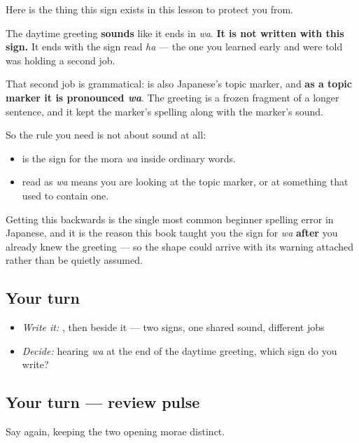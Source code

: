 \begin{grammarlens}[title={What you've built — and the trap}]
Here is the thing this sign exists in this lesson to protect you from.

The daytime greeting \textbf{sounds} like it ends in \emph{wa}. \textbf{It is not written with this sign.} It ends with the sign read \emph{ha} — the one you learned early and were told was holding a second job.

That second job is grammatical:  is also Japanese's topic marker, and \textbf{as a topic marker it is pronounced \emph{wa}}. The greeting is a frozen fragment of a longer sentence, and it kept the marker's spelling along with the marker's sound.

So the rule you need is not about sound at all:

\begin{itemize}
\raggedright
  \item \textbf{} is the sign for the mora \emph{wa} inside ordinary words.
  \item \textbf{} read as \emph{wa} means you are looking at the topic marker, or at something that used to contain one.
\end{itemize}

Getting this backwards is the single most common beginner spelling error in Japanese, and it is the reason this book taught you the sign for \emph{wa} \textbf{after} you already knew the greeting — so the shape could arrive with its warning attached rather than be quietly assumed.
\end{grammarlens}

\subsection*{Your turn}
\begin{itemize}
\raggedright
  \item \emph{Write it:} , then  beside it — two signs, one shared sound, different jobs
  \item \emph{Decide:} hearing \emph{wa} at the end of the daytime greeting, which sign do you write?
\end{itemize}

\subsection*{Your turn — review pulse}
Say \textbf{} again, keeping the two opening morae distinct.

